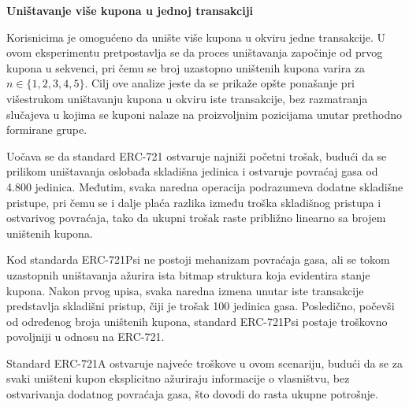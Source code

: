 \begin{description}
\item \textbf{Uništavanje više kupona u jednoj transakciji}

Korisnicima je omogućeno da unište više kupona u okviru jedne transakcije. U ovom eksperimentu pretpostavlja se da proces uništavanja započinje od prvog kupona u sekvenci, pri čemu se broj uzastopno uništenih kupona varira za $n \in \{1, 2, 3, 4, 5\}$. Cilj ove analize jeste da se prikaže opšte ponašanje pri višestrukom uništavanju kupona u okviru iste transakcije, bez razmatranja slučajeva u kojima se kuponi nalaze na proizvoljnim pozicijama unutar prethodno formirane grupe.

Uočava se da standard ERC-721 ostvaruje najniži početni trošak, budući da se prilikom uništavanja oslobađa skladišna jedinica i ostvaruje povraćaj gasa od 4.800 jedinica. Međutim, svaka naredna operacija podrazumeva dodatne skladišne pristupe, pri čemu se i dalje plaća razlika između troška skladišnog pristupa i ostvarivog povraćaja, tako da ukupni trošak raste približno linearno sa brojem uništenih kupona.

Kod standarda ERC-721Psi ne postoji mehanizam povraćaja gasa, ali se tokom uzastopnih uništavanja ažurira ista bitmap struktura koja evidentira stanje kupona. Nakon prvog upisa, svaka naredna izmena unutar iste transakcije predstavlja skladišni pristup, čiji je trošak 100 jedinica gasa. Posledično, počevši od određenog broja uništenih kupona, standard ERC-721Psi postaje troškovno povoljniji u odnosu na ERC-721.

Standard ERC-721A ostvaruje najveće troškove u ovom scenariju, budući da se za svaki uništeni kupon eksplicitno ažuriraju informacije o vlasništvu, bez ostvarivanja dodatnog povraćaja gasa, što dovodi do rasta ukupne potrošnje.

\begin{rezultati}[H]
\centering

\begin{minipage}{0.48\textwidth}
\centering


\end{minipage}
\end{rezultati}
\end{description}
